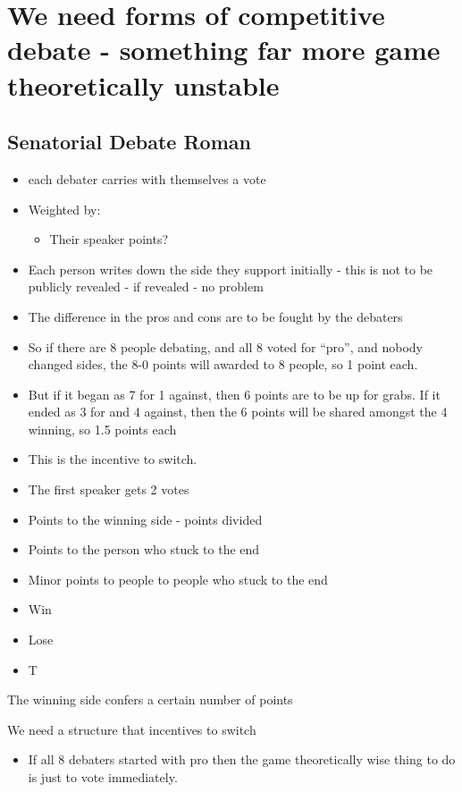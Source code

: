 


\section{We need forms of competitive debate - something far more game theoretically unstable}

\subsection{Senatorial Debate Roman}

\begin{itemize}
    \item each debater carries with themselves a vote
    \item Weighted by:
    \begin{itemize}
        \item Their speaker points?
    \end{itemize}
    \item Each person writes down the side they support initially - this is not to be publicly revealed - if revealed - no problem
    \item The difference in the pros and cons are to be fought by the debaters
    \item So if there are 8 people debating, and all 8 voted for ``pro'', and nobody changed sides, the 8-0 points will awarded to 8 people, so 1 point each.
    \item But if it began as 7 for 1 against, then 6 points are to be up for grabs. If it ended as 3 for and 4 against, then the 6 points will be shared amongst the 4 winning, so 1.5 points each
    \item This is the incentive to switch.
    \item The first speaker gets 2 votes
    \item Points to the winning side - points divided
    \item Points to the person who stuck to the end
    \item Minor points to people to people who stuck to the end
    \item Win
    \item Lose
    \item T
\end{itemize}

The winning side confers a certain number of points

We need a structure that incentives to switch

\begin{itemize}
    \item If all 8 debaters started with pro then the game theoretically wise thing to do is just to vote immediately.
\end{itemize}


